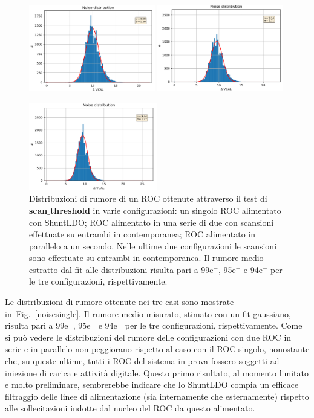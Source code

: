 \begin{figure}[t]
\centering
\includegraphics[width=0.49\textwidth]{Immagini/NoiseSingle}
\hfill
\includegraphics[width=0.49\textwidth]{Immagini/NoiseSerial}

\includegraphics[width=0.50\textwidth]{Immagini/NoiseParallel}
\caption{Distribuzioni di rumore di un ROC ottenute attraverso il test di \textbf{scan$\_$threshold} in varie configurazioni: un singolo ROC alimentato con ShuntLDO; ROC alimentato in una serie di due con scansioni effettuate su entrambi in contemporanea; ROC alimentato in parallelo a un secondo. Nelle ultime due configurazioni le scansioni sono effettuate su entrambi in contemporanea. Il rumore medio estratto dal fit alle distribuzioni risulta pari a 99e$^-$, 95e$^-$ e 94e$^-$ per le tre configurazioni, rispettivamente.}
\label{noisesingle}
\label{noiseserial}
\label{noiseparallel}
\end{figure}

Le distribuzioni di rumore ottenute nei tre casi sono mostrate in~Fig.~\ref{noisesingle}. Il rumore medio misurato, stimato con un fit gaussiano, risulta pari a 99e$^-$, 95e$^-$ e 94e$^-$ per le tre configurazioni, rispettivamente. Come si può vedere le distribuzioni del rumore delle configurazioni con due ROC in serie e in parallelo non peggiorano rispetto al caso con il ROC singolo, nonostante che, su queste ultime, tutti i ROC del sistema in prova fossero soggetti ad iniezione di carica e attività digitale. Questo primo risultato, al momento limitato e molto preliminare, sembrerebbe indicare che lo ShuntLDO compia un efficace filtraggio delle linee di alimentazione (sia internamente che esternamente) rispetto alle sollecitazioni indotte dal nucleo del ROC da questo alimentato.

